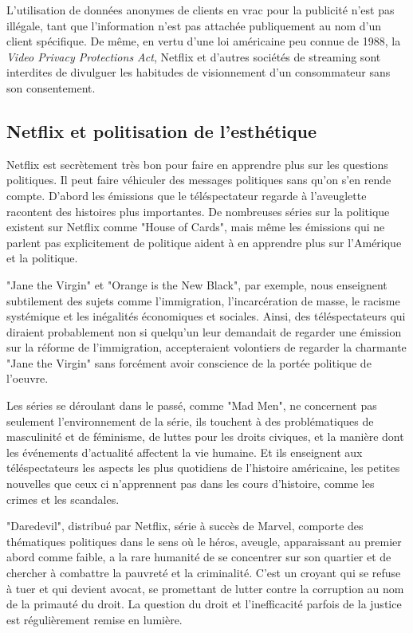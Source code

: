 \documentclass[a4paper,14pt]{extreport}
\begin{document}
L'utilisation de données anonymes de clients en vrac pour la publicité n'est pas illégale, tant que l'information n'est pas attachée publiquement au nom d'un client spécifique. De même, en vertu d'une loi américaine peu connue de 1988, la \textit{Video Privacy Protections Act}, Netflix et d'autres sociétés de streaming sont interdites de divulguer les habitudes de visionnement d'un consommateur sans son consentement.

\subsection{Netflix et politisation de l’esthétique}

Netflix est secrètement très bon pour faire en apprendre plus sur les questions politiques. Il peut faire véhiculer des messages politiques sans qu'on s'en rende compte. D’abord les émissions que le téléspectateur regarde à l'aveuglette racontent des histoires plus importantes. De nombreuses séries sur la politique existent sur Netflix comme "House of Cards", mais même les émissions qui ne parlent pas explicitement de politique aident à en apprendre plus sur l'Amérique et la politique.

"Jane the Virgin" et "Orange is the New Black", par exemple, nous enseignent subtilement des sujets comme l'immigration, l'incarcération de masse, le racisme systémique et les inégalités économiques et sociales. Ainsi, des téléspectateurs qui diraient probablement non si quelqu'un leur demandait de regarder une émission sur la réforme de l'immigration, accepteraient  volontiers de regarder la charmante "Jane the Virgin" sans forcément avoir conscience de la portée politique de l'oeuvre.

Les séries se déroulant dans le passé, comme "Mad Men", ne concernent pas seulement l'environnement de la série, ils touchent à des problématiques de masculinité et de féminisme, de luttes pour les droits civiques, et la manière dont les événements d'actualité affectent la vie humaine. Et ils enseignent aux téléspectateurs les aspects les plus quotidiens de l'histoire américaine, les petites nouvelles que ceux ci n'apprennent pas dans les cours d'histoire, comme les crimes et les scandales.

"Daredevil", distribué par Netflix, série à succès de Marvel, comporte des thématiques politiques dans le sens où le héros, aveugle, apparaissant au premier abord comme faible, a la rare humanité de se concentrer sur son quartier et de chercher à combattre la pauvreté et la criminalité. C’est un croyant qui se refuse à tuer et qui devient avocat, se promettant de lutter contre la corruption au nom de la primauté du droit. La question du droit et l’inefficacité parfois de la justice est régulièrement remise en lumière.
\end{document}
